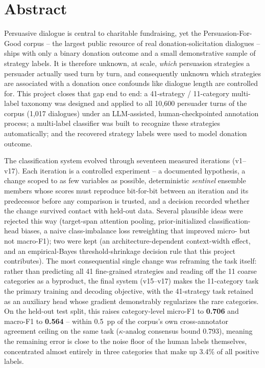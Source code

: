 \chapter*{Abstract}

Persuasive dialogue is central to charitable fundraising, yet the
Persuasion-For-Good corpus \citep{wang2019persuasion} -- the largest public
resource of real donation-solicitation dialogues -- ships with only a
binary donation outcome and a small demonstrative sample of strategy labels.
It is therefore unknown, at scale, \emph{which} persuasion strategies a
persuader actually used turn by turn, and consequently unknown which
strategies are associated with a donation once confounds like dialogue
length are controlled for. This project closes that gap end to end: a
41-strategy / 11-category multi-label taxonomy was designed and applied to
all 10{,}600 persuader turns of the corpus (1{,}017 dialogues) under an
LLM-assisted, human-checkpointed annotation process; a multi-label
classifier was built to recognize these strategies automatically; and the
recovered strategy labels were used to model donation outcome.

The classification system evolved through seventeen measured iterations
(v1--v17). Each iteration is a controlled experiment -- a documented
hypothesis, a change scoped to as few variables as possible, deterministic
\emph{sentinel} ensemble members whose scores must reproduce bit-for-bit
between an iteration and its predecessor before any comparison is trusted,
and a decision recorded whether the change survived contact with held-out
data. Several plausible ideas were rejected this way (target-span attention
pooling, prior-initialized classification-head biases, a naive
class-imbalance loss reweighting that improved micro- but not macro-F1);
two were kept (an architecture-dependent context-width effect, and an
empirical-Bayes threshold-shrinkage decision rule that this project
contributes). The most consequential single change was reframing the task
itself: rather than predicting all 41 fine-grained strategies and reading
off the 11 coarse categories as a byproduct, the final system (v15--v17)
makes the 11-category task the primary training and decoding objective,
with the 41-strategy task retained as an auxiliary head whose gradient
demonstrably regularizes the rare categories. On the held-out test split,
this raises category-level micro-F1 to \textbf{0.706} and macro-F1 to
\textbf{0.564} -- within \SI{0.5}{pp} of the corpus's own cross-annotator
agreement ceiling on the same task ($\kappa\text{-analog}$ consensus bound
0.793), meaning the remaining error is close to the noise floor of the
human labels themselves, concentrated almost entirely in three
categories that make up 3.4\% of all positive labels.

